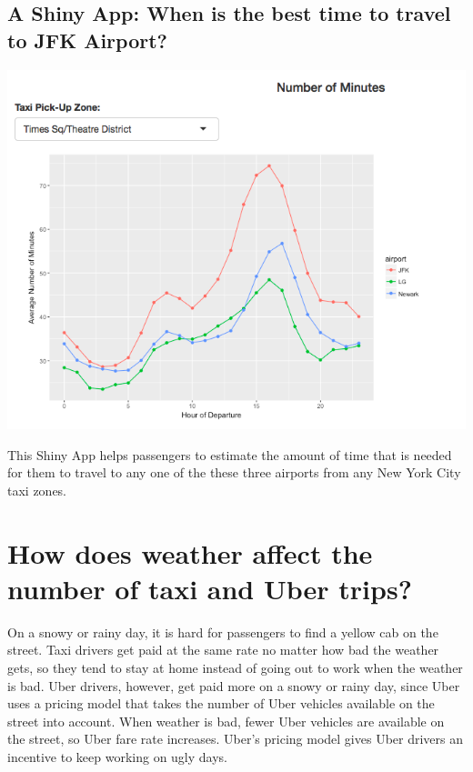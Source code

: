 \documentclass[12pt,twoside]{reedthesis}
\theoremstyle{definition}
\theoremstyle{definition}
\theoremstyle{definition}
\theoremstyle{remark}
\begin{document}
\subsection{A Shiny App: When is the best time to travel to JFK
Airport?}\label{a-shiny-app-when-is-the-best-time-to-travel-to-jfk-airport}
\begin{center}\includegraphics[width=6.74in]{figure/shinyapp} \end{center}

This Shiny App helps passengers to estimate the amount of time that is
needed for them to travel to any one of the these three airports from
any New York City taxi zones.

\section{How does weather affect the number of taxi and Uber
trips?}\label{how-does-weather-affect-the-number-of-taxi-and-uber-trips}

On a snowy or rainy day, it is hard for passengers to find a yellow cab
on the street. Taxi drivers get paid at the same rate no matter how bad
the weather gets, so they tend to stay at home instead of going out to
work when the weather is bad. Uber drivers, however, get paid more on a
snowy or rainy day, since Uber uses a pricing model that takes the
number of Uber vehicles available on the street into account. When
weather is bad, fewer Uber vehicles are available on the street, so Uber
fare rate increases. Uber's pricing model gives Uber drivers an
incentive to keep working on ugly days.
\end{document}
